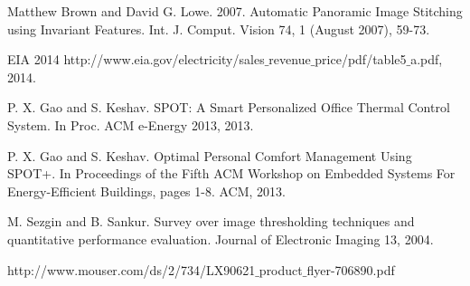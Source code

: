   Matthew Brown and David G. Lowe. 2007. Automatic Panoramic Image Stitching using Invariant Features. Int. J. Comput. Vision 74, 1 (August 2007), 59-73.

 EIA 2014  http://www.eia.gov/electricity/sales$\_$revenue$\_$price/pdf/table5$\_$a.pdf, 2014.

 P. X. Gao and S. Keshav. SPOT: A Smart Personalized Office Thermal Control System. In Proc. ACM e-Energy 2013, 2013.

 P. X. Gao and S. Keshav. Optimal Personal Comfort Management Using SPOT+. In Proceedings of the Fifth ACM Workshop on Embedded Systems For Energy-Efficient Buildings, pages 1-8. ACM, 2013.

 M. Sezgin and B. Sankur. Survey over image thresholding techniques and quantitative performance evaluation. Journal of Electronic Imaging 13, 2004.

 http://www.mouser.com/ds/2/734/LX90621$\_$product$\_$flyer-706890.pdf

